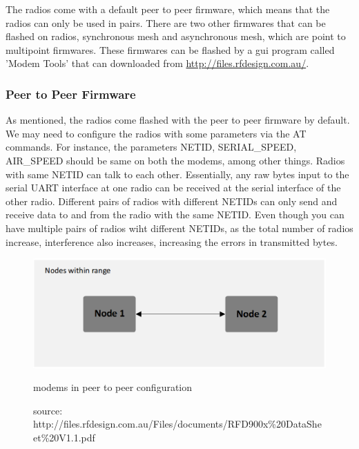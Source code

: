 The radios come with a default peer to peer firmware, which means that the radios can only be used in pairs. There are two other firmwares that can be flashed on radios, synchronous mesh and asynchronous mesh, which are point to multipoint firmwares. These firmwares can be flashed by a gui program called 'Modem Tools' that can downloaded from \url{http://files.rfdesign.com.au/}.

\subsubsection{Peer to Peer Firmware}
As mentioned, the radios come flashed with the peer to peer firmware by default. We may need to configure the radios with some parameters via the AT commands. For instance, the parameters NETID, SERIAL\_SPEED, AIR\_SPEED should be same on both the modems, among other things. Radios with same NETID can talk to each other. Essentially, any raw bytes input to the serial UART interface at one radio can be received at the serial interface of the other radio. Different pairs of radios with different NETIDs can only send and receive data to and from the radio with the same NETID. Even though you can have multiple pairs of radios wiht different NETIDs, as the total number of radios increase, interference also increases, increasing the errors in transmitted bytes.

\begin{figure}[h]
	\centering
	\includegraphics[scale=0.4]{Pictures/peer.png}
	\caption{modems in peer to peer configuration}
	\label{fig: rfdpeer}
	\caption*{source: http://files.rfdesign.com.au/Files/documents/RFD900x\%20DataSheet\%20V1.1.pdf}
\end{figure}

